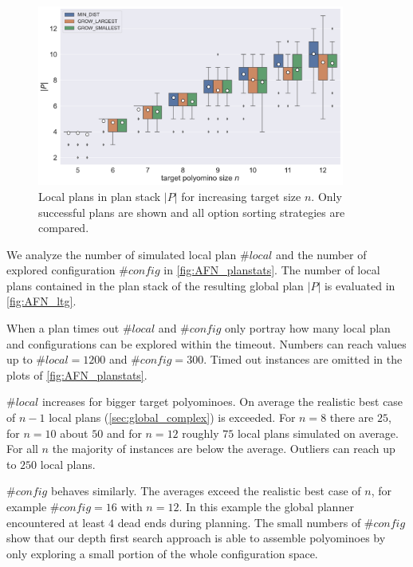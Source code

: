 \begin{figure}
	\centering
	\includegraphics[width=0.9\textwidth]{figures/plots/AFN_ltg.pdf}
	\caption[Local plans in plan stack for increasing target size]{Local plans in plan stack $|P|$ for increasing target size $n$. Only successful plans are shown and all option sorting strategies are compared.}
	\label{fig:AFN_ltg}
\end{figure}


We analyze the number of simulated local plan $\#\textit{local}$ and the number of explored configuration $\#\textit{config}$ in \autoref{fig:AFN_planstats}.
The number of local plans contained in the plan stack of the resulting global plan $|P|$ is evaluated in \autoref{fig:AFN_ltg}.

When a plan times out $\#\textit{local}$ and $\#\textit{config}$ only portray how many local plan and configurations can be explored within the timeout.
Numbers can reach values up to $\#\textit{local} = 1200$ and $\#\textit{config} = 300$.
Timed out instances are omitted in the plots of \autoref{fig:AFN_planstats}.

$\#\textit{local}$ increases for bigger target polyominoes.
On average the realistic best case of $n-1$ local plans (\autoref{sec:global_complex}) is exceeded.
For $n=8$ there are $25$, for $n=10$ about $50$ and for $n=12$ roughly $75$ local plans simulated on average.
For all $n$ the majority of instances are below the average.
Outliers can reach up to $250$ local plans.

$\#\textit{config}$ behaves similarly.
The averages exceed the realistic best case of $n$, for example $\#\textit{config} = 16$ with $n=12$.
In this example the global planner encountered at least $4$ dead ends during planning.
The small numbers of $\#\textit{config}$ show that our depth first search approach is able to assemble polyominoes by only exploring a small portion of the whole configuration space.

